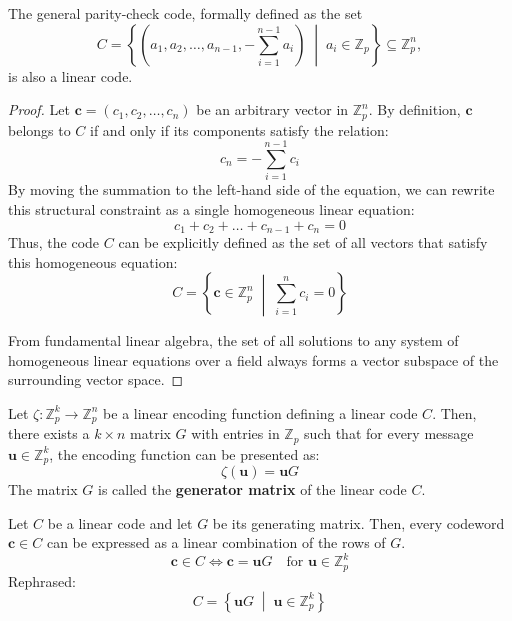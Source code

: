 \documentclass[docmute]{article}
\begin{document}
\begin{example}
The general parity-check code, formally defined as the set
$$C = \left\{ \left( a_1, a_2, \dots, a_{n-1}, -\sum_{i=1}^{n-1} a_i \right) \;\middle|\; a_i \in \mathbb{Z}_p \right\} \subseteq \mathbb{Z}_p^n,$$
is also a linear code.
\end{example}

\begin{proof}
Let $\mathbf{c} = (c_1, c_2, \dots, c_n)$ be an arbitrary vector in $\mathbb{Z}_p^n$.
By definition, $\mathbf{c}$ belongs to $C$ if and only if its components satisfy the relation:
$$c_n = -\sum_{i=1}^{n-1} c_i$$
By moving the summation to the left-hand side of the equation, we can rewrite this structural constraint as a single homogeneous linear equation:
$$c_1 + c_2 + \dots + c_{n-1} + c_n = 0$$
Thus, the code $C$ can be explicitly defined as the set of all vectors that satisfy this homogeneous equation:
$$C = \left\{ \mathbf{c} \in \mathbb{Z}_p^n \;\middle|\; \sum_{i=1}^{n} c_i = 0 \right\}$$

From fundamental linear algebra, the set of all solutions to any system of homogeneous linear equations over a field always forms a vector subspace of the surrounding vector space.
\end{proof}

\begin{remark}
Let $\zeta: \mathbb{Z}_p^k \to \mathbb{Z}_p^n$ be a linear encoding function defining a linear code $C$.
Then, there exists a $k \times n$ matrix $G$ with entries in $\mathbb{Z}_p$ such that for every message $\mathbf{u} \in \mathbb{Z}_p^k$, the encoding function can be presented as:
$$\zeta(\mathbf{u}) = \mathbf{u}G$$
The matrix $G$ is called the \textbf{generator matrix} of the linear code $C$.
\end{remark}

\begin{remark}
Let $C$ be a linear code and let $G$ be its generating matrix.
Then, every codeword $\mathbf{c} \in C$ can be expressed as a linear combination of the rows of $G$.
$$\mathbf{c} \in C \iff \mathbf{c} = \mathbf{u}G \quad \text{for } \mathbf{u} \in \mathbb{Z}_p^k$$
Rephrased: $$C = \left\{ \mathbf{u}G \;\middle|\; \mathbf{u} \in \mathbb{Z}_p^k \right\}$$
\end{remark}
\end{document}
